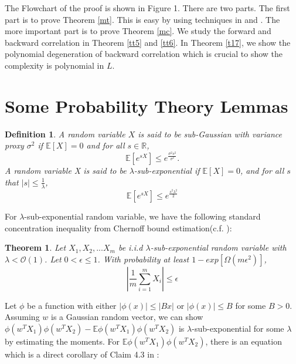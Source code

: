 \documentclass{article}
\newcommand{\cO}{\mathcal{O}}
\newtheorem{theo}{\textbf{Theorem}}
\newtheorem{def1}{\textbf{Definition}}
\begin{document}
The Flowchart of the proof is shown in Figure 1. There are two parts. The first part is to prove Theorem \ref{mt}. This is easy by using techniques in \cite{rate} and \cite{cao}. The more important part is to prove Theorem \ref{mc}. We study the forward and backward correlation in Theorem \ref{tt5} and \ref{tt6}. In Theorem \ref{t17}, we show the polynomial degeneration of backward correlation which is crucial to show the complexity is polynomial in $L$.


\section {Some Probability Theory Lemmas}
\begin{def1}
A random variable $X$ is said to be sub-Gaussian with variance proxy $\sigma^2$ if $ \mathbb{E}[X]=0$ and for all $s\in\mathbb{R}$,
\begin{equation}
\mathbb{E}[e^{sX}]\leq e^{\frac{\sigma^2s^2}{\sigma^2}}.
\end{equation}
A random variable X is said to be $\lambda$-sub-exponential if $ \mathbb{E}[X]=0$, and for all $s$ that $|s|\leq \frac{1}{\lambda}$,
\begin{equation}
\mathbb{E}[e^{sX}]\leq e^{\frac{s^2\lambda^2}{2}}
\end{equation}
\end{def1}
For  $\lambda$-sub-exponential  random variable, we have the following standard concentration inequality from Chernoff bound estimation(c.f. \cite{2013Concentration}):
\begin{theo}\label{ci}
Let $X_1,X_2,...X_m$ be i.i.d $\lambda$-sub-exponential  random variable with $\lambda<\cO(1)$. Let $0<\epsilon\leq 1$. With probability at least $1-exp[\Omega(m\epsilon^2)]$,
\begin{equation}
|\frac{1}{m}\sum_{i=1}^mX_i|\leq \epsilon
\end{equation}
\end{theo}
Let $\phi$ be a function with either $|\phi(x)|\leq |Bx|$ or $|\phi(x)|\leq B$  for some $B>0$. Assuming $w$ is a Gaussian random vector, we can show $\phi(w^TX_1)\phi(w^TX_2)-\mathbb{E}\phi(w^TX_1)\phi(w^TX_2)$ is $\lambda$-sub-exponential for some $\lambda$ by estimating the moments. For $\mathbb{E}\phi(w^TX_1)\phi(w^TX_2)$, there is an equation which is a direct corollary of  Claim 4.3 in \cite{171100501}:
\end{document}
